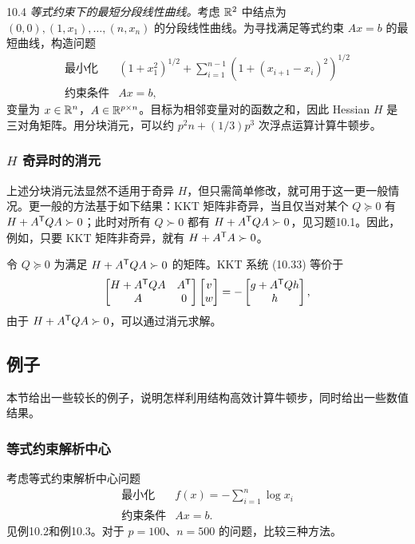 \begin{origexample}{10.4}
\emph{等式约束下的最短分段线性曲线。}考虑 $\mathbb R^2$ 中结点为 $(0,0),(1,x_1),\ldots,(n,x_n)$ 的分段线性曲线。为寻找满足等式约束 $Ax=b$ 的最短曲线，构造问题
\[\begin{array}{ll}\text{最小化}&(1+x_1^2)^{1/2}+\displaystyle\sum_{i=1}^{n-1}(1+(x_{i+1}-x_i)^2)^{1/2}\\\text{约束条件}&Ax=b,\end{array}\]
变量为 $x\in\mathbb R^n$，$A\in\mathbb R^{p\times n}$。目标为相邻变量对的函数之和，因此 Hessian $H$ 是三对角矩阵。用分块消元，可以约 $p^2n+(1/3)p^3$ 次浮点运算计算牛顿步。
\end{origexample}

\subsubsection*{$H$ 奇异时的消元}
上述分块消元法显然不适用于奇异 $H$，但只需简单修改，就可用于这一更一般情况。更一般的方法基于如下结果：KKT 矩阵非奇异，当且仅当对某个 $Q\succeq0$ 有 $H+A^\mathsf T QA\succ0$；此时对所有 $Q\succ0$ 都有 $H+A^\mathsf T QA\succ0$，见习题10.1。因此，例如，只要 KKT 矩阵非奇异，就有 $H+A^\mathsf T A\succ0$。

令 $Q\succeq0$ 为满足 $H+A^\mathsf T QA\succ0$ 的矩阵。KKT 系统 (10.33) 等价于
\[\begin{bmatrix}H+A^\mathsf T QA&A^\mathsf T\\A&0\end{bmatrix}\begin{bmatrix}v\\w\end{bmatrix}=-\begin{bmatrix}g+A^\mathsf T Qh\\h\end{bmatrix},\]
由于 $H+A^\mathsf T QA\succ0$，可以通过消元求解。

\subsection{例子}
本节给出一些较长的例子，说明怎样利用结构高效计算牛顿步，同时给出一些数值结果。

\subsubsection*{等式约束解析中心}
考虑等式约束解析中心问题
\[\begin{array}{ll}\text{最小化}&f(x)=-\displaystyle\sum_{i=1}^n\log x_i\\\text{约束条件}&Ax=b.\end{array}\]
见例10.2和例10.3。对于 $p=100$、$n=500$ 的问题，比较三种方法。


